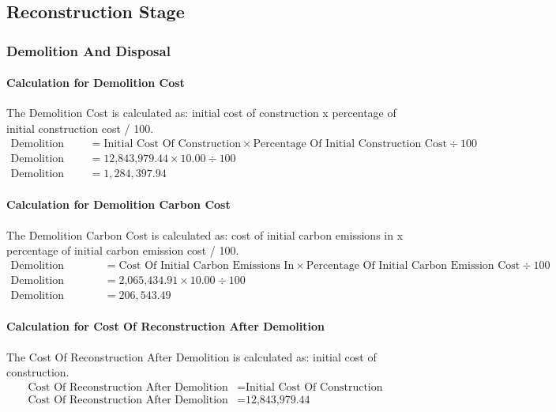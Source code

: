 \documentclass{article}
\begin{document}
\subsection{Reconstruction Stage}
\subsubsection{Demolition And Disposal}
 \paragraph{Calculation for Demolition Cost} 
The Demolition Cost is calculated as: initial cost of construction x percentage of initial construction cost / 100.
\begin{align*}
 \text{Demolition Cost} &= \text{Initial Cost Of Construction} \times \text{Percentage Of Initial Construction Cost} \div 100 \\
 \text{Demolition Cost} &= \text{12,843,979.44} \times 10.00 \div 100 \\
 \text{Demolition Cost} &= 1,284,397.94 
\end{align*}
 \paragraph{Calculation for Demolition Carbon Cost} 
The Demolition Carbon Cost is calculated as: cost of initial carbon emissions in x percentage of initial carbon emission cost / 100.
\begin{align*}
 \text{Demolition Carbon Cost} &= \text{Cost Of Initial Carbon Emissions In} \times \text{Percentage Of Initial Carbon Emission Cost} \div 100 \\
 \text{Demolition Carbon Cost} &= \text{2,065,434.91} \times 10.00 \div 100 \\
 \text{Demolition Carbon Cost} &= 206,543.49 
\end{align*}
 \paragraph{Calculation for Cost Of Reconstruction After Demolition} 
The Cost Of Reconstruction After Demolition is calculated as: initial cost of construction.
\begin{align*}
 \text{Cost Of Reconstruction After Demolition} &= \text{Initial Cost Of Construction} \\
 \text{Cost Of Reconstruction After Demolition} &= \text{12,843,979.44} \\
\end{align*}
\end{document}
